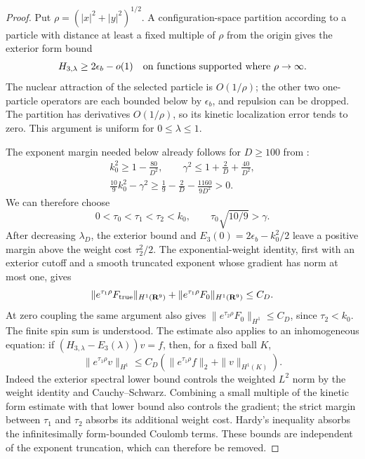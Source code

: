 \begin{proof}
Put \(\rho=(|x|^2+|y|^2)^{1/2}\).  A configuration-space partition
according to a particle with distance at least a fixed multiple of
\(\rho\) from the origin gives the exterior form bound
\begin{equation}
 H_{3,\lambda}\geq2\epsilon_b-o(1)
 \quad\hbox{on functions supported where }\rho\to\infty.
 \label{eq:configuration-exterior-bound}
\end{equation}
The nuclear attraction of the selected particle is \(O(1/\rho)\);
the other two one-particle operators are each bounded below by
\(\epsilon_b\), and repulsion can be dropped.  The partition has
derivatives \(O(1/\rho)\), so its kinetic localization error tends
to zero.  This argument is uniform for \(0\leq\lambda\leq1\).

The exponent margin needed below already follows for \(D\ge100\)
from :
\[
 \begin{gathered}
 k_0^2\ge1-\frac{80}{D^2},\qquad
 \gamma^2\le1+\frac2D+\frac{40}{D^2},\\
 \frac{10}{9}k_0^2-\gamma^2
 \ge\frac19-\frac2D-\frac{1160}{9D^2}>0.
 \end{gathered}
\]
We can therefore choose
\[
 0<\tau_0<\tau_1<\tau_2<k_0,\qquad \tau_0\sqrt{10/9}>\gamma.
 \]
After decreasing \(\lambda_D\), the exterior bound and
\(E_3(0)=2\epsilon_b-k_0^2/2\) leave a positive margin above the
weight cost \(\tau_2^2/2\).  The exponential-weight identity, first
with an exterior cutoff and a smooth truncated exponent whose
gradient has norm at most one, gives
\begin{equation}
 \|e^{\tau_1\rho}F_{\mathrm{true}}\|_{H^1(\mathbf R^9)}
 +\|e^{\tau_1\rho}F_0\|_{H^1(\mathbf R^9)}\leq C_D.
 \label{eq:configuration-weight}
\end{equation}
At zero coupling the same argument also gives
\(\|e^{\tau_2\rho}F_0\|_{H^1}\leq C_D\), since \(\tau_2<k_0\).
The finite spin sum is understood.  The estimate also applies to an
inhomogeneous equation: if
\((H_{3,\lambda}-E_3(\lambda))v=f\), then, for a fixed ball \(K\),
\begin{equation}
 \|e^{\tau_1\rho}v\|_{H^1}
 \leq C_D\left(\|e^{\tau_1\rho}f\|_2+\|v\|_{H^1(K)}\right).
 \label{eq:inhomogeneous-weight}
\end{equation}
Indeed the exterior spectral lower bound controls the weighted
\(L^2\) norm by the weight identity and Cauchy--Schwarz.  Combining
a small multiple of the kinetic form estimate with that lower bound
also controls the gradient; the strict margin between \(\tau_1\) and
\(\tau_2\) absorbs its additional weight cost.  Hardy's inequality
absorbs the infinitesimally form-bounded Coulomb terms.  These bounds
are independent of the exponent truncation, which can therefore
be removed.


\end{proof}
